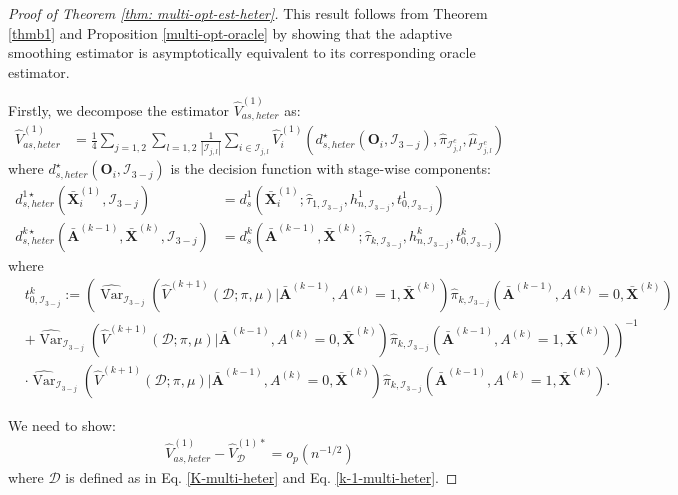 \documentclass[11pt]{article}
\theoremstyle{referenceplain}
\theoremstyle{referencedefinition}
\theoremstyle{referenceremark}
\begin{document}
\begin{proof}[Proof of Theorem \ref{thm: multi-opt-est-heter}]
This result follows from Theorem \ref{thmb1} and Proposition \ref{multi-opt-oracle} by showing that the adaptive smoothing estimator is asymptotically equivalent to its corresponding oracle estimator.

Firstly, we decompose the estimator $\widehat{V}_{as,heter}^{(1)}$ as:
\begin{align}
    \widehat{V}_{as,heter}^{(1)} &= \frac{1}{4}\sum_{j=1,2}\sum_{l=1,2}\frac{1}{|\mathcal{I}_{j,l}|}\sum_{i\in\mathcal{I}_{j,l}}\widehat{V}_i^{(1)}(d_{s,heter}^{\star}(\mathbf{O}_i,\mathcal{I}_{3-j}),\widehat{\pi}_{\mathcal{I}_{j,l}^c},\widehat{\mu}_{\mathcal{I}_{j,l}^c})
\end{align}
where $d_{s,heter}^{\star}(\mathbf{O}_i,\mathcal{I}_{3-j})$ is the decision function with stage-wise components:
\begin{align}
    d_{s,heter}^{1\star}(\bar{\mathbf{X}}_i^{(1)},\mathcal{I}_{3-j}) &= d_{s}^1(\bar{\mathbf{X}}_i^{(1)};\widehat{\tau}_{1,\mathcal{I}_{3-j}},h_{n,\mathcal{I}_{3-j}}^1, t_{0,\mathcal{I}_{3-j}}^1)\label{heter-multi-as-1}\\
    d_{s,heter}^{k\star}(\bar{\mathbf{A}}^{(k-1)},\bar{\mathbf{X}}^{(k)},\mathcal{I}_{3-j}) &= d_{s}^k(\bar{\mathbf{A}}^{(k-1)},\bar{\mathbf{X}}^{(k)};\widehat{\tau}_{k,\mathcal{I}_{3-j}},h_{n,\mathcal{I}_{3-j}}^k,t_{0,\mathcal{I}_{3-j}}^k)\label{heter-multi-as-k}
\end{align}
where
\begin{align*}
   & t_{0,\mathcal{I}_{3-j}}^k:=\left(\widehat{\operatorname{Var}}_{\mathcal{I}_{3-j}}(\widehat{V}^{(k+1)}(\mathcal{D};\pi,\mu)|\bar{\mathbf{A}}^{(k-1)},A^{(k)}=1,\bar{\mathbf{X}}^{(k)})\widehat{\pi}_{k,\mathcal{I}_{3-j}}(\bar{\mathbf{A}}^{(k-1)},A^{(k)}=0,\bar{\mathbf{X}}^{(k)})\right.\\
   &+\left.\widehat{\operatorname{Var}}_{\mathcal{I}_{3-j}}(\widehat{V}^{(k+1)}(\mathcal{D};\pi,\mu)|\bar{\mathbf{A}}^{(k-1)},A^{(k)}=0,\bar{\mathbf{X}}^{(k)})\widehat{\pi}_{k,\mathcal{I}_{3-j}}(\bar{\mathbf{A}}^{(k-1)},A^{(k)}=1,\bar{\mathbf{X}}^{(k)})\right)^{-1}\\
   &\cdot \widehat{\operatorname{Var}}_{\mathcal{I}_{3-j}}(\widehat{V}^{(k+1)}(\mathcal{D};\pi,\mu)|\bar{\mathbf{A}}^{(k-1)},A^{(k)}=0,\bar{\mathbf{X}}^{(k)})\widehat{\pi}_{k,\mathcal{I}_{3-j}}(\bar{\mathbf{A}}^{(k-1)},A^{(k)}=1,\bar{\mathbf{X}}^{(k)}).
\end{align*}

We need to show:
\begin{align}
    \widehat{V}_{as,heter}^{(1)} - \widehat{V}_{\mathcal{D}}^{(1)*} = o_p(n^{-1/2})
\end{align}
 where $\mathcal{D}$ is defined as in Eq. \eqref{K-multi-heter} and  Eq. \eqref{k-1-multi-heter}.


\end{proof}
\end{document}

